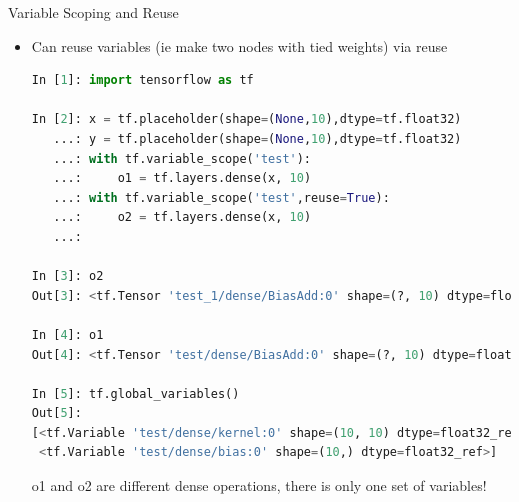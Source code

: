 \documentclass[]{beamer}
\begin{document}
\begin{frame}[fragile]{Variable Scoping and Reuse}
\begin{itemize}
\item Can reuse variables (ie make two nodes with tied weights) via reuse
\lstset{style=mystyle2}
\begin{lstlisting}[language=python]
In [1]: import tensorflow as tf

In [2]: x = tf.placeholder(shape=(None,10),dtype=tf.float32)
   ...: y = tf.placeholder(shape=(None,10),dtype=tf.float32)
   ...: with tf.variable_scope('test'):
   ...:     o1 = tf.layers.dense(x, 10)
   ...: with tf.variable_scope('test',reuse=True):
   ...:     o2 = tf.layers.dense(x, 10)
   ...:     

In [3]: o2
Out[3]: <tf.Tensor 'test_1/dense/BiasAdd:0' shape=(?, 10) dtype=float32>

In [4]: o1
Out[4]: <tf.Tensor 'test/dense/BiasAdd:0' shape=(?, 10) dtype=float32>

In [5]: tf.global_variables()
Out[5]: 
[<tf.Variable 'test/dense/kernel:0' shape=(10, 10) dtype=float32_ref>,
 <tf.Variable 'test/dense/bias:0' shape=(10,) dtype=float32_ref>]
\end{lstlisting}
\lstset{style=mystyle}
o1 and o2 are different dense operations, there is only one set of variables!
\end{itemize}
\end{frame}
\end{document}
